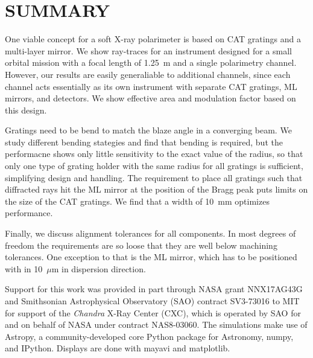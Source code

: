 \documentclass[]{spie}  %
\begin{document}
\section{SUMMARY}
One viable concept for a soft X-ray polarimeter is based on CAT
gratings and a multi-layer mirror. We show ray-traces for an
instrument designed for a small orbital mission with a focal length of
1.25~m and a single polarimetry channel. However, our results are
easily generaliable to additional channels, since each channel acts
essentially as its own instrument with separate CAT gratings, ML
mirrors, and detectors. We show effective area and modulation factor
based on this design.

Gratings need to be bend to match the blaze angle in a converging
beam. We study different bending stategies and find that bending is
required, but the performacne shows only little sensitivity to the
exact value of the radius, so that only one type of grating holder
with the same radius for all gratings is sufficient, simplifying
design and handling. The requirement to place all gratings such that
diffracted rays hit the ML mirror at the position of the Bragg peak
puts limits on the size of the CAT gratings. We find that a width of
10~mm optimizes performance.

Finally, we discuss alignment tolerances for all components. In most
degrees of freedom the requirements are so loose that they are well
below machining tolerances. One exception to that is the ML mirror,
which has to be positioned with in 10~$\mu$m in dispersion direction.

\acknowledgments %
Support
for this work was provided in part through NASA grant NNX17AG43G and
Smithsonian Astrophysical Observatory (SAO) contract SV3-73016 to MIT
for support of the {\em Chandra} X-Ray Center (CXC), which is operated
by SAO for and on behalf of NASA under contract NAS8-03060.  The
simulations make use of Astropy, a community-developed core Python
package for Astronomy\cite{astropy1,astropy2}, numpy\cite{numpy}, and
IPython\cite{IPython}. Displays are done with mayavi\cite{mayavi} and
matplotlib\cite{matplotlib}.


\end{document}
